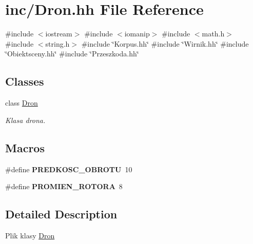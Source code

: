 \hypertarget{_dron_8hh}{}\section{inc/\+Dron.hh File Reference}
\label{_dron_8hh}
{\ttfamily \#include $<$iostream$>$}\newline
{\ttfamily \#include $<$iomanip$>$}\newline
{\ttfamily \#include $<$math.\+h$>$}\newline
{\ttfamily \#include $<$string.\+h$>$}\newline
{\ttfamily \#include \char`\"{}Korpus.\+hh\char`\"{}}\newline
{\ttfamily \#include \char`\"{}Wirnik.\+hh\char`\"{}}\newline
{\ttfamily \#include \char`\"{}Obiektsceny.\+hh\char`\"{}}\newline
{\ttfamily \#include \char`\"{}Przeszkoda.\+hh\char`\"{}}\newline
\subsection*{Classes}
\begin{DoxyCompactItemize}
\item 
class \mbox{\hyperlink{class_dron}{Dron}}
\begin{DoxyCompactList}\small\item\em Klasa drona. \end{DoxyCompactList}\end{DoxyCompactItemize}
\subsection*{Macros}
\begin{DoxyCompactItemize}
\item 
\mbox{\label{_dron_8hh_afcc0ddbea0c7938834e8fbeb85ac07f9}} 
\#define {\bfseries P\+R\+E\+D\+K\+O\+S\+C\+\_\+\+O\+B\+R\+O\+TU}~10
\item 
\mbox{\label{_dron_8hh_a479988a27345f3b401ca6b1bc118912c}} 
\#define {\bfseries P\+R\+O\+M\+I\+E\+N\+\_\+\+R\+O\+T\+O\+RA}~8
\end{DoxyCompactItemize}


\subsection{Detailed Description}
Plik klasy \mbox{\hyperlink{class_dron}{Dron}} 